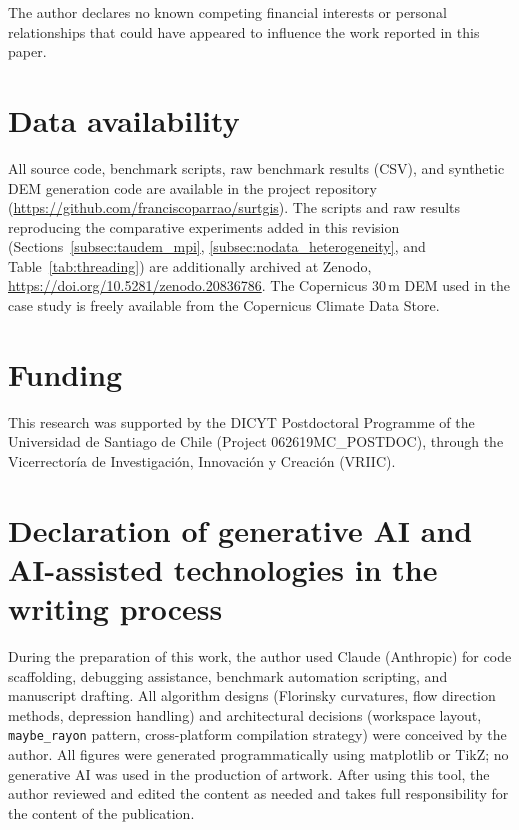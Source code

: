 \documentclass[preprint,review,12pt,authoryear]{elsarticle}
\newif\ifmarkedrev
\newcommand{\revtext}[1]{\ifmarkedrev\textcolor{blue}{#1}\else#1\fi}
\begin{document}
The author declares no known competing financial interests or personal relationships that could have appeared to influence the work reported in this paper.

\section*{Data availability}

All source code, benchmark scripts, raw benchmark results (CSV), and synthetic DEM generation code are available in the project repository (\url{https://github.com/franciscoparrao/surtgis}). \revtext{The scripts and raw results reproducing the comparative experiments added in this revision (Sections~\ref{subsec:taudem_mpi}, \ref{subsec:nodata_heterogeneity}, and Table~\ref{tab:threading}) are additionally archived at Zenodo, \url{https://doi.org/10.5281/zenodo.20836786}.} The Copernicus 30\,m DEM used in the case study is freely available from the Copernicus Climate Data Store.

\section*{Funding}

This research was supported by the DICYT Postdoctoral Programme of the Universidad de Santiago de Chile (Project 062619MC\_POSTDOC), through the Vicerrectoría de Investigación, Innovación y Creación (VRIIC).

\section*{Declaration of generative AI and AI-assisted technologies in the writing process}

During the preparation of this work, the author used Claude (Anthropic) for code scaffolding, debugging assistance, benchmark automation scripting, and manuscript drafting. All algorithm designs (Florinsky curvatures, flow direction methods, depression handling) and architectural decisions (workspace layout, \texttt{maybe\_rayon} pattern, cross-platform compilation strategy) were conceived by the author. All figures were generated programmatically using matplotlib or TikZ; no generative AI was used in the production of artwork. After using this tool, the author reviewed and edited the content as needed and takes full responsibility for the content of the publication.
\end{document}
